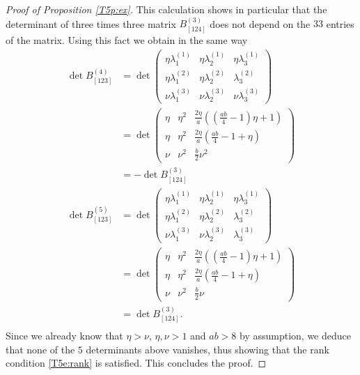 \documentclass[titlepage]{amsart}
\numberwithin{equation}{section}
\theoremstyle{plain}
\theoremstyle{definition}
\theoremstyle{remark}
\begin{document}
\begin{proof}[Proof of Proposition \ref{T5p:ex}]
This calculation shows in particular that the determinant of three times three matrix  $B^{(3)}_{[124]}$
does not depend on the $33$ entries of the matrix. Using this fact we obtain in the same way
%
%
\begin{align*}
\det B^{(4)}_{[1 2 3]}
&=
%
\det \begin{pmatrix} \eta \lambda^{(1)}_1  & \eta   \lambda^{(1)}_2 &  \eta  \lambda^{(1)}_3 \\
\eta  \lambda^{(2)}_1 & \eta \lambda^{(2)}_2 &    \lambda^{(2)}_3 \\
 \nu   \lambda^{(3)}_1 & \nu \lambda^{(3)}_2 &   \nu \lambda^{(3)}_3 \end{pmatrix}
\\
%
&=\det\begin{pmatrix}
	\eta &\eta^2&\tfrac{2\eta}{a}\left((\tfrac{ab}{4}-1)\eta+1\right)\\
    \eta &\eta^2&\tfrac{2\eta}{a}\left(\tfrac{ab}{4}-1+\eta\right)\\
    \nu &\nu^2&   \tfrac{b}{2}\nu^2
\end{pmatrix}\\
&=    -\det B^{(3)}_{[124]}  \\%
%
\det B^{(5)}_{[1 2 3]}  &=
%
\det  \begin{pmatrix} \eta \lambda^{(1)}_1  & \eta   \lambda^{(1)}_2 &  \eta  \lambda^{(1)}_3  \\
\eta  \lambda^{(2)}_1 & \eta \lambda^{(2)}_2 &    \lambda^{(2)}_3 \\
 \nu   \lambda^{(3)}_1 & \nu \lambda^{(3)}_2 &    \lambda^{(3)}_3 
\end{pmatrix}
\\
%
&=\det\begin{pmatrix}
	\eta &\eta^2&\tfrac{2\eta}{a}\left((\tfrac{ab}{4}-1)\eta+1\right)\\
    \eta &\eta^2&\tfrac{2\eta}{a}\left(\tfrac{ab}{4}-1+\eta\right)\\
    \nu &\nu^2&     \tfrac{b}{2}\nu
\end{pmatrix}\\
&= \det B^{(3)}_{[124]}. \\
\end{align*}
Since we already know that $\eta>\nu$, $\eta,\nu>1$ and $ab>8$ by assumption, we deduce that none of the $5$ determinants above vanishes, thus showing that the rank condition \eqref{T5e:rank} is satisfied. This concludes the proof.
\end{proof}


\appendix
\end{document}
